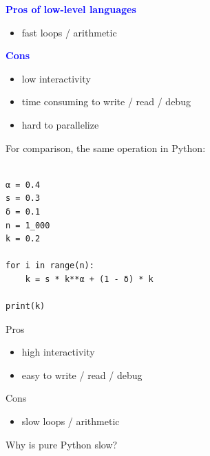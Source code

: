 \documentclass[
    xcolor={svgnames,dvipsnames},
    hyperref={colorlinks, citecolor=DeepPink4, linkcolor=DarkRed, urlcolor=DarkBlue}
    ]{beamer}  %
\newcommand{\navy}[1]{\textcolor{Blue}{\bf #1}}
\newcommand{\1}{\mathbbm 1}
\begin{document}
\begin{frame}

    \navy{Pros of low-level languages}

    \begin{itemize}
        \item fast loops / arithmetic
    \end{itemize}


    \vspace{0.5em}

    \navy{Cons}

    \begin{itemize}
        \item low interactivity
        \item time consuming to write / read / debug
        \item hard to parallelize
    \end{itemize}

\end{frame}




\begin{frame}[fragile]

    For comparison, the same operation in Python:
    
    \begin{verbatim}

α = 0.4
s = 0.3
δ = 0.1
n = 1_000
k = 0.2

for i in range(n):
    k = s * k**α + (1 - δ) * k

print(k)

    \end{verbatim}

\end{frame}



\begin{frame}

    Pros

    \begin{itemize}
        \item high interactivity
        \item easy to write / read / debug
    \end{itemize}

    \vspace{0.5em}

    Cons

    \begin{itemize}
        \item slow loops / arithmetic
    \end{itemize}

    \pause
    \vspace{0.5em}
    \vspace{0.5em}
    Why is pure Python slow?


\end{frame}
\end{document}
